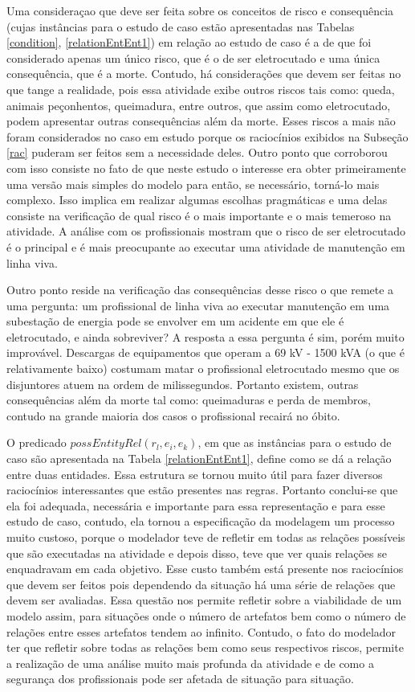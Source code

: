 Uma consideraçao que deve ser feita sobre os conceitos de risco e consequência (cujas instâncias para o estudo de caso estão apresentadas nas Tabelas \ref{condition}, \ref{relationEntEnt1}) em relação ao estudo de caso é a de que foi considerado apenas um único risco, que é o de ser eletrocutado e uma única consequência, que é a morte. Contudo, há considerações que devem ser feitas no que tange a realidade, pois essa atividade exibe outros riscos tais como: queda, animais peçonhentos, queimadura, entre outros, que assim como eletrocutado, podem apresentar outras consequências além da morte. Esses riscos a mais não foram considerados no caso em estudo porque os raciocínios exibidos na Subseção \ref{rac} puderam ser feitos sem a necessidade deles. Outro ponto que corroborou com isso consiste no fato de que neste estudo o interesse era obter primeiramente uma versão mais simples do modelo para então, se necessário, torná-lo mais complexo. Isso implica em realizar algumas escolhas pragmáticas e uma delas consiste na verificação de qual risco é o mais importante e o mais temeroso na atividade. A análise com os profissionais mostram que o risco de ser eletrocutado é o principal e é mais preocupante ao executar uma atividade de manutenção em linha viva. 

Outro ponto reside na verificação das consequências desse risco o que remete a uma pergunta: um profissional de linha viva ao executar manutenção em uma subestação de energia pode se envolver em um acidente em que ele é eletrocutado, e ainda sobreviver? A resposta a essa pergunta é sim, porém muito improvável. Descargas de equipamentos que operam a 69 kV - 1500 kVA  (o que é relativamente baixo) costumam matar o profissional eletrocutado mesmo que os disjuntores atuem na ordem de milissegundos. Portanto existem, outras consequências além da morte tal como: queimaduras e perda de membros, contudo na grande maioria dos casos o profissional recairá no óbito. 

O predicado $possEntityRel(r_l,e_i,e_k)$, em que as instâncias para o estudo de caso são apresentada na Tabela \ref{relationEntEnt1}, define como se dá a relação entre duas entidades. Essa estrutura se tornou muito útil para fazer diversos raciocínios interessantes que estão presentes nas regras. Portanto conclui-se que ela foi adequada, necessária e importante para essa representação e para esse estudo de caso, contudo, ela tornou a especificação da modelagem um processo muito custoso, porque o modelador teve de refletir em todas as relações possíveis que são executadas na atividade e depois disso, teve que ver quais relações se enquadravam em cada objetivo. Esse custo também está presente nos raciocínios que devem ser feitos pois dependendo da situação há uma série de relações que devem ser avaliadas. Essa questão nos permite refletir sobre a viabilidade de um modelo assim, para situações onde o número de artefatos bem como o número de relações entre esses artefatos tendem ao infinito. Contudo, o fato do modelador ter que refletir sobre todas as relações bem como seus respectivos riscos, permite a realização de uma análise muito mais profunda da atividade e de como a segurança dos profissionais pode ser afetada de situação para situação. 

